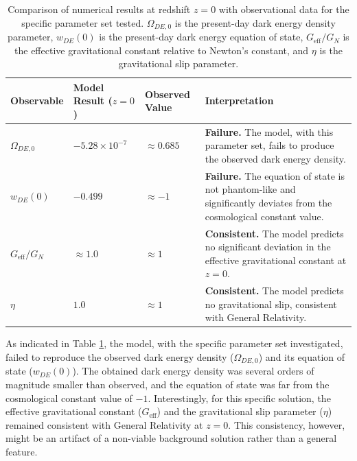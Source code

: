 \documentclass[twocolumn]{aastex631}
\begin{document}
\begin{table}[ht!]
\caption{Comparison of numerical results at redshift $z=0$ with observational data for the specific parameter set tested. $\Omega_{DE,0}$ is the present-day dark energy density parameter, $w_{DE}(0)$ is the present-day dark energy equation of state, $G_{\text{eff}}/G_N$ is the effective gravitational constant relative to Newton's constant, and $\eta$ is the gravitational slip parameter.}
\label{tab:cosmo_results}
\centering
\begin{tabular}{p{} p{} p{} p{}}
\hline
\textbf{Observable} & \textbf{Model Result ($z=0$)} & \textbf{Observed Value} & \textbf{Interpretation} \\
\hline
$\Omega_{DE,0}$ & $-5.28 \times 10^{-7}$ & $\approx 0.685$ & \textbf{Failure.} The model, with this parameter set, fails to produce the observed dark energy density. \\
$w_{DE}(0)$ & $-0.499$ & $\approx -1$ & \textbf{Failure.} The equation of state is not phantom-like and significantly deviates from the cosmological constant value. \\
$G_{\text{eff}}/G_N$ & $\approx 1.0$ & $\approx 1$ & \textbf{Consistent.} The model predicts no significant deviation in the effective gravitational constant at $z=0$. \\
$\eta$ & $1.0$ & $\approx 1$ & \textbf{Consistent.} The model predicts no gravitational slip, consistent with General Relativity. \\
\hline
\end{tabular}
\end{table}

As indicated in Table \ref{tab:cosmo_results}, the model, with the specific parameter set investigated, failed to reproduce the observed dark energy density ($\Omega_{DE,0}$) and its equation of state ($w_{DE}(0)$). The obtained dark energy density was several orders of magnitude smaller than observed, and the equation of state was far from the cosmological constant value of $-1$. Interestingly, for this specific solution, the effective gravitational constant ($G_{\text{eff}}$) and the gravitational slip parameter (${\eta}$) remained consistent with General Relativity at $z=0$. This consistency, however, might be an artifact of a non-viable background solution rather than a general feature.
\end{document}
